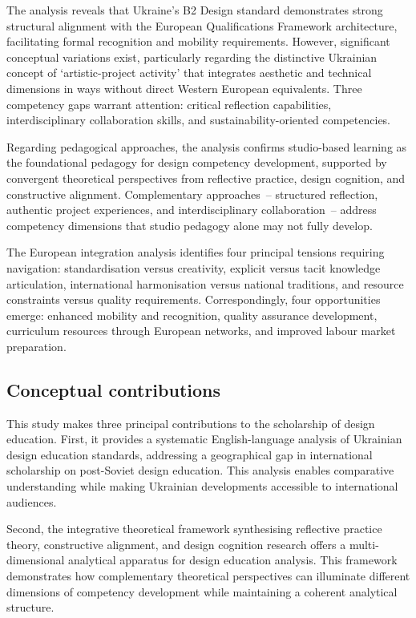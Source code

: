 \documentclass[ed]{acnsart}
\begin{document}
	The analysis reveals that Ukraine's B2 Design standard demonstrates strong structural alignment with the European Qualifications Framework architecture, facilitating formal recognition and mobility requirements. However, significant conceptual variations exist, particularly regarding the distinctive Ukrainian concept of `artistic-project activity' that integrates aesthetic and technical dimensions in ways without direct Western European equivalents. Three competency gaps warrant attention: critical reflection capabilities, interdisciplinary collaboration skills, and sustainability-oriented competencies.
	
	Regarding pedagogical approaches, the analysis confirms studio-based learning as the foundational pedagogy for design competency development, supported by convergent theoretical perspectives from reflective practice, design cognition, and constructive alignment. Complementary approaches~-- structured reflection, authentic project experiences, and interdisciplinary collaboration~-- address competency dimensions that studio pedagogy alone may not fully develop.
	
	The European integration analysis identifies four principal tensions requiring navigation: standardisation versus creativity, explicit versus tacit knowledge articulation, international harmonisation versus national traditions, and resource constraints versus quality requirements. Correspondingly, four opportunities emerge: enhanced mobility and recognition, quality assurance development, curriculum resources through European networks, and improved labour market preparation.
	
	\subsection{Conceptual contributions}
	
	This study makes three principal contributions to the scholarship of design education. First, it provides a systematic English-language analysis of Ukrainian design education standards, addressing a geographical gap in international scholarship on post-Soviet design education. This analysis enables comparative understanding while making Ukrainian developments accessible to international audiences.
	
	Second, the integrative theoretical framework synthesising reflective practice theory, constructive alignment, and design cognition research offers a multi-dimensional analytical apparatus for design education analysis. This framework demonstrates how complementary theoretical perspectives can illuminate different dimensions of competency development while maintaining a coherent analytical structure.
	
\end{document}
